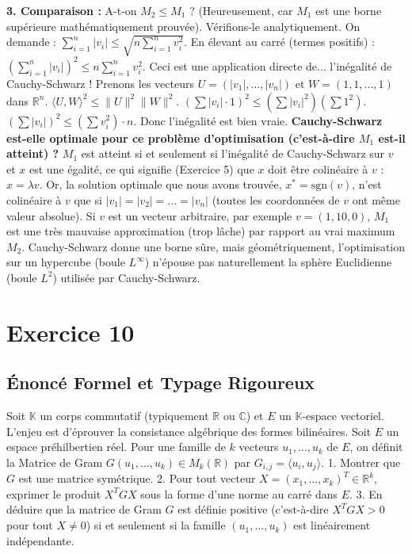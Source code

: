 \documentclass[11pt,a4paper]{report}
\begin{document}
\textbf{3. Comparaison :}
A-t-on $M_2 \le M_1$ ? (Heureusement, car $M_1$ est une borne supérieure mathématiquement prouvée).
Vérifions-le analytiquement.
On demande : $\sum_{i=1}^n |v_i| \le \sqrt{n \sum_{i=1}^n v_i^2}$.
En élevant au carré (termes positifs) :
$(\sum_{i=1}^n |v_i|)^2 \le n \sum_{i=1}^n v_i^2$.
Ceci est une application directe de... l'inégalité de Cauchy-Schwarz !
Prenons les vecteurs $U = (|v_1|, ..., |v_n|)$ et $W = (1, 1, ..., 1)$ dans $\mathbb{R}^n$.
$\langle U, W \rangle^2 \le \|U\|^2 \|W\|^2$.
$(\sum |v_i| \cdot 1)^2 \le (\sum |v_i|^2) (\sum 1^2)$.
$(\sum |v_i|)^2 \le (\sum v_i^2) \cdot n$.
Donc l'inégalité est bien vraie.
\textbf{Cauchy-Schwarz est-elle optimale pour ce problème d'optimisation (c'est-à-dire $M_1$ est-il atteint) ?}
$M_1$ est atteint si et seulement si l'inégalité de Cauchy-Schwarz sur $v$ et $x$ est une égalité, ce qui signifie (Exercice 5) que $x$ doit être colinéaire à $v$ : $x = \lambda v$.
Or, la solution optimale que nous avons trouvée, $x^* = \text{sgn}(v)$, n'est colinéaire à $v$ que si $|v_1| = |v_2| = ... = |v_n|$ (toutes les coordonnées de $v$ ont même valeur absolue).
Si $v$ est un vecteur arbitraire, par exemple $v = (1, 10, 0)$, $M_1$ est une très mauvaise approximation (trop lâche) par rapport au vrai maximum $M_2$. Cauchy-Schwarz donne une borne sûre, mais géométriquement, l'optimisation sur un hypercube (boule $L^\infty$) n'épouse pas naturellement la sphère Euclidienne (boule $L^2$) utilisée par Cauchy-Schwarz.


\section{Exercice 10}


\subsection*{Énoncé Formel et Typage Rigoureux}
Soit $\mathbb{K}$ un corps commutatif (typiquement $\mathbb{R}$ ou $\mathbb{C}$) et $E$ un $\mathbb{K}$-espace vectoriel. L'enjeu est d'éprouver la consistance algébrique des formes bilinéaires.
Soit $E$ un espace préhilbertien réel. Pour une famille de $k$ vecteurs $u_1, ..., u_k$ de $E$, on définit la Matrice de Gram $G(u_1, ..., u_k) \in M_k(\mathbb{R})$ par $G_{i,j} = \langle u_i, u_j \rangle$.
1. Montrer que $G$ est une matrice symétrique.
2. Pour tout vecteur $X = (x_1, ..., x_k)^T \in \mathbb{R}^k$, exprimer le produit $X^T G X$ sous la forme d'une norme au carré dans $E$.
3. En déduire que la matrice de Gram $G$ est définie positive (c'est-à-dire $X^T G X > 0$ pour tout $X \neq 0$) si et seulement si la famille $(u_1, ..., u_k)$ est linéairement indépendante.
\end{document}
